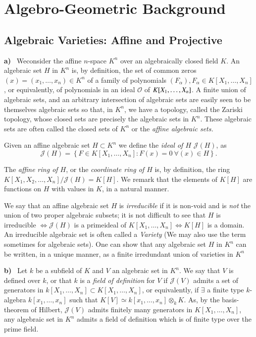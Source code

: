 \chapter{Algebro-Geometric Background}\label{chap1}

\section{Algebraic Varieties: Affine and Projective}\label{chap1:sec1}%

\textbf{a)}~ We\pageoriginale consider the affine $n$-space $K^n$ over an algebraically
  closed field $K$. An algebraic set $H$ in $K^n$ is, by definition,
  the set of common zeros $(x) = (x_1,\ldots, x_n)  \in   K^n$ of a
  family of polynomials $(F_\alpha ), F_\alpha \in  K [X_1,\ldots,
    X_n]$, or equivalently, of polynomials in an ideal $\mathscr{O}$
  of $K [X_1,\break\ldots,X_n]$. A finite union of algebraic sets, and an
  arbitrary intersection of algebraic sets are easily seen to be
  themselves algebraic sets so that, in $K^n$, we have a topology,
  called the Zariski topology, whose closed sets are precisely the
  algebraic sets in $K^n$. These algebraic sets are often called the
  closed sets of $K^n$ or the \textit{affine algebraic sets.} 

  Given an affine algebraic set $H \subset K^n$ we define the \textit{
    ideal of $H$ } $\mathcal{J}(H)$, as  
  $$
  \mathcal{J}(H) = \left\{ F \in K [X_1,\ldots, X_n] : F (x) = 0~
  \forall (x) \in  H \right\}. 
  $$

  The \textit{affine ring of $H$}, or the \textit{coordinate ring of
    $H$} is, by definition, the ring $K [X_1,X_2, \ldots, X_n] \bigg /
  \mathcal{J} (H) = K[H]$. We remark that the elements of $K[H]$ are
  functions on $H$ with values in $K$, in a natural manner.  

  We say that an affine algebraic set $H$ is \textit{ irreducible } if
  it is non-void and is \textit{ not } the union of two proper
  algebraic subsets; it is not difficult to see that $H$ is
  irreducible $\Leftrightarrow \mathcal{J}(H)$ is a prime\pageoriginale ideal of $K
  [X_1,\ldots,X_n] \Leftrightarrow K[H]$ is a domain. An irreducible
  algebraic set is often called a \textit{Variety} (We may also use
  the term sometimes for algebraic sets). One can show that any algebraic set
  $H$ in $K^n$ can be written, in a unique manner, as a finite
  irredundant union of varieties in $K^n$ 

\textbf{b)}~ Let $k$ be a subfield of $K$ and $V$ an algebraic set in
  $K^n$. We say that $V$ is defined over $k$, or that $k$ is a
  \textit{ field of definition } for $V$ if $\mathcal{J}(V)$ admits a
  set of generators in $k[X_1,\ldots, X_n] \subset
  K[X_1,\ldots,X_n]$, or equivalently, if $\exists$ a finite type
  $k$-algebra $k[x_1,\ldots, x_n]$ such that $K[V] \simeq
  k[x_1,\ldots,x_n] \otimes_k K$. As, by the basis-theorem of Hilbert,
  $\mathcal{J}(V)$ admits finitely many generators in
  $K[X_1,\ldots,X_n]$, any algebraic set in $K^n$ admits a field of
  definition which is of finite type over the prime field. 

